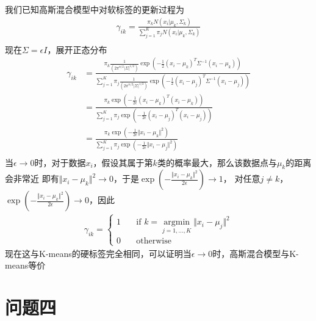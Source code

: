 \documentclass[12pt, a4paper]{article}
\begin{document}
我们已知高斯混合模型中对软标签的更新过程为
\begin{align*}
    \gamma_{ik}=\frac{\pi_k N(x_i\vert\mu_k,\Sigma_k)}{\sum_{j=1}^K \pi_j N(x_i\vert\mu_k,\Sigma_k)}\\
\end{align*}
现在$\Sigma=\epsilon I$，展开正态分布
\begin{align*}
    \gamma_{ik}&=\frac{\pi_k \frac{1}{(2\pi^{n/2}\vert\Sigma\vert^{1/2})}
    \exp(-\frac{1}{2}(x_i-\mu_k)^T\Sigma^{-1}(x_i-\mu_k))}
    {\sum_{j=1}^K \pi_j \frac{1}{(2\pi^{n/2}\vert\Sigma\vert^{1/2})}
    \exp(-\frac{1}{2}(x_i-\mu_j)^T\Sigma^{-1}(x_i-\mu_j))}\\
    &=\frac{\pi_k\exp(-\frac{1}{2\epsilon}(x_i-\mu_k)^T(x_i-\mu_k))}
    {\sum_{j=1}^{K}\pi_j\exp(-\frac{1}{2\epsilon}(x_i-\mu_j)^T(x_i-\mu_j))}\\
    &=\frac{\pi_k\exp(-\frac{1}{2\epsilon}\Vert x_i-\mu_k\Vert^2)}
    {\sum_{j=1}^{K}\pi_j\exp(-\frac{1}{2\epsilon}\Vert x_i-\mu_j\Vert^2)}\\
\end{align*}
当$\epsilon\rightarrow0$时，对于数据$x_i$，假设其属于第$k$类的概率最大，那么该数据点与$\mu_k$的距离会非常近
即有$\Vert x_i-\mu_k\Vert^2\rightarrow0$，于是$\exp(-\frac{\Vert x_i-\mu_k\Vert^2}{2\epsilon})\rightarrow1$，
对任意$j\neq k$，$\exp(-\frac{\Vert x_i-\mu_k\Vert^2}{2\epsilon})\rightarrow0$，因此
\begin{align*}
    \gamma_{ik}=\left\{
        \begin{aligned}
            1 & \quad\text{if }k=\mathop{argmin}\limits_{j=1,\dots,K}\Vert x_i-\mu_j \Vert^2\\
            0 & \quad\text{otherwise}
        \end{aligned}
    \right.
\end{align*}
现在这与K-means的硬标签完全相同，可以证明当$\epsilon\rightarrow0$时，高斯混合模型与K-means等价

\section{问题四}

\subsection{}



\subsection{}
\end{document}
